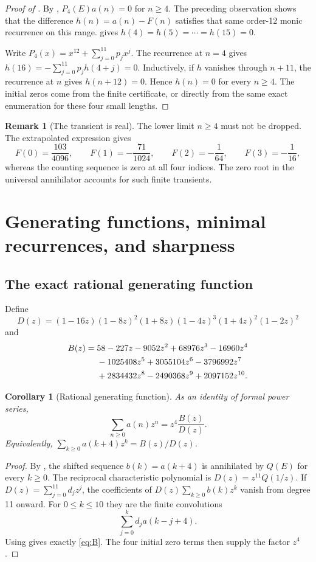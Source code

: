 \documentclass[11pt,letterpaper]{article}
\newtheorem{corollary}[theorem]{Corollary}
\theoremstyle{definition}
\newtheorem{remark}[theorem]{Remark}
\newcommand{\1}{\mathbf 1}
\begin{document}
\begin{proof}[Proof of ]
By , $P_4(E)a(n)=0$ for $n\ge4$. The preceding observation
shows that the difference $h(n)=a(n)-F(n)$ satisfies that same order-12 monic
recurrence on this range.  gives
$h(4)=h(5)=\cdots=h(15)=0$.

Write $P_4(x)=x^{12}+\sum_{j=0}^{11}p_jx^j$. The recurrence at $n=4$ gives
$h(16)=-\sum_{j=0}^{11}p_jh(4+j)=0$. Inductively, if $h$ vanishes through
$n+11$, the recurrence at $n$ gives $h(n+12)=0$. Hence $h(n)=0$ for every
$n\ge4$. The initial zeros come from the finite certificate, or directly from
the same exact enumeration for these four small lengths.
\end{proof}

\begin{remark}[The transient is real]
The lower limit $n\ge4$ must not be dropped. The extrapolated expression gives
\[
 F(0)=\frac{103}{4096},\qquad F(1)=-\frac{71}{1024},\qquad
 F(2)=-\frac1{64},\qquad F(3)=-\frac1{16},
\]
whereas the counting sequence is zero at all four indices. The zero root in
the universal annihilator accounts for such finite transients.
\end{remark}

\section{Generating functions, minimal recurrences, and sharpness}
\label{sec:gf}

\subsection{The exact rational generating function}
Define
\begin{equation}\label{eq:D}
 D(z)=(1-16z)(1-8z)^2(1+8z)(1-4z)^3(1+4z)^2(1-2z)^2
\end{equation}
and
\begin{align}
 B(z)={}&58-227z-9052z^2+68976z^3-16960z^4 \notag\\
 &-1025408z^5+3055104z^6-3796992z^7 \notag\\
 &+2834432z^8-2490368z^9+2097152z^{10}.
 \label{eq:B}
\end{align}

\begin{corollary}[Rational generating function]\label{cor:gf}
As an identity of formal power series,
\begin{equation}\label{eq:GF}
 \sum_{n\ge0}a(n)z^n=z^4\frac{B(z)}{D(z)}.
\end{equation}
Equivalently, $\sum_{k\ge0}a(k+4)z^k=B(z)/D(z)$.
\end{corollary}
\begin{proof}
By , the shifted sequence $b(k)=a(k+4)$ is annihilated by
$Q(E)$ for every $k\ge0$. The reciprocal characteristic polynomial is
$D(z)=z^{11}Q(1/z)$. If $D(z)=\sum_{j=0}^{11}d_jz^j$, the coefficients of
$D(z)\sum_{k\ge0}b(k)z^k$ vanish from degree 11 onward. For $0\le k\le10$ they
are the finite convolutions
\[
 \sum_{j=0}^kd_j a(k-j+4).
\]
Using  gives exactly \eqref{eq:B}. The four initial zero terms
then supply the factor $z^4$.
\end{proof}
\end{document}
